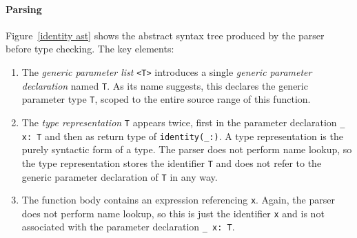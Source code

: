 \documentclass[a4paper,headsepline,bibliography=totoc,toc=flat,fleqn,twoside=semi]{scrbook}
\theoremstyle{definition}
\theoremstyle{definition}
\theoremstyle{definition}
\begin{document}
\paragraph{Parsing} Figure~\ref{identity ast} shows the abstract syntax tree produced by the parser before type checking. The key elements:
\begin{enumerate}
\item The \emph{generic parameter list} \texttt{<T>} introduces a single \emph{generic parameter declaration} named \texttt{T}. As its name suggests, this declares the generic parameter type \texttt{T}, scoped to the entire source range of this function.
\item The \emph{type representation} \texttt{T} appears twice, first in the parameter declaration \verb|_ x: T| and then as return type of \verb|identity(_:)|. A type representation is the purely syntactic form of a type. The parser does not perform name lookup, so the type representation stores the identifier \texttt{T} and does not refer to the generic parameter declaration of \texttt{T} in any way.
\item The function body contains an expression referencing \texttt{x}. Again, the parser does not perform name lookup, so this is just the identifier \texttt{x} and is not associated with the parameter declaration \verb|_ x: T|.
\end{enumerate}

\end{document}
